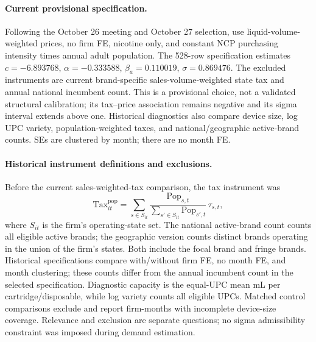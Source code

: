 \documentclass[11pt]{article}
\begin{document}
\paragraph{Current provisional specification.} Following the October 26 meeting and October 27 selection, use liquid-volume-weighted prices, no firm FE, nicotine only, and constant NCP purchasing intensity times annual adult population. The 528-row specification estimates $c=-6.893768$, $\alpha=-0.333588$, $\beta_a=0.110019$, $\sigma=0.869476$. The excluded instruments are current brand-specific sales-volume-weighted state tax and annual national incumbent count. This is a provisional choice, not a validated structural calibration; its tax--price association remains negative and its sigma interval extends above one. Historical diagnostics also compare device size, log UPC variety, population-weighted taxes, and national/geographic active-brand counts. SEs are clustered by month; there are no month FE.

\paragraph{Historical instrument definitions and exclusions.} Before the current sales-weighted-tax comparison, the tax instrument was
\[
\mathrm{Tax}^{\mathrm{pop}}_{it}=\sum_{s\in S_{it}}
\frac{\mathrm{Pop}_{s,t}}{\sum_{s'\in S_{it}}\mathrm{Pop}_{s',t}}\,\tau_{s,t},
\]
where $S_{it}$ is the firm's operating-state set. The national active-brand count counts all eligible active brands; the geographic version counts distinct brands operating in the union of the firm's states. Both include the focal brand and fringe brands. Historical specifications compare with/without firm FE, no month FE, and month clustering; these counts differ from the annual incumbent count in the selected specification. Diagnostic capacity is the equal-UPC mean mL per cartridge/disposable, while log variety counts all eligible UPCs. Matched control comparisons exclude and report firm-months with incomplete device-size coverage. Relevance and exclusion are separate questions; no sigma admissibility constraint was imposed during demand estimation.
\end{document}
